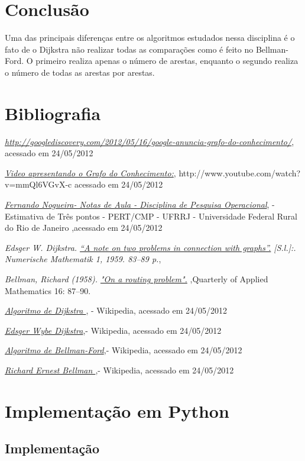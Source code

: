 \documentclass[a4paper,10pt]{article}
\newcommand{\code}[2]{
  \hrulefill
  \subsection*{#1}
  
  \vspace{2em}
}
\begin{document}
\section{Conclusão}{
Uma das principais diferenças entre os algoritmos estudados nessa disciplina é o fato de o Dijkstra não realizar
todas as comparações como é feito no Bellman-Ford. O primeiro realiza apenas o número de arestas, enquanto
o segundo realiza o número de todas as arestas por arestas.

}



\section{Bibliografia}{
 \begin{thebibliography}{9}
  \emph{\href{http://goo.gl/bZyyN}{http://googlediscovery.com/2012/05/16/google-anuncia-grafo-do-conhecimento/}},  acessado em 24/05/2012

  \emph{\href{http://www.youtube.com/watch?v=mmQl6VGvX-c}{Video apresentando o Grafo do Conhecimento:}}, http://www.youtube.com/watch?v=mmQl6VGvX-c acessado em 24/05/2012
 
  \emph{\href{http://www.ufrrj.br/codep/materialcursos/gerenciamento/gerenciamentotempo/CGP-GT_PERT_CPM_FernandoNogueira.pdf}{ Fernando Nogueira- Notas de Aula - Disciplina de Pesquisa Operacional}}, - Estimativa de Três pontos - PERT/CMP - UFRRJ - Universidade Federal Rural do Rio de Janeiro ,acessado em 24/05/2012
 

  \emph{Edsger W. Dijkstra. \href{http://www-m3.ma.tum.de/foswiki/pub/MN0506/WebHome/dijkstra.pdf}{``A note on two problems in connection with graphs''.}
 [S.l.]:. Numerische Mathematik 1, 1959. 83–89 p.},
    
  \emph{Bellman, Richard (1958). \href{http://monet.skku.ac.kr/course_materials/undergraduate/al/lecture/2006/BellmanFord.pdf}{"On a routing problem".} },Quarterly of Applied Mathematics 16: 87–90.   
 

  \emph{\href{http://pt.wikipedia.org/wiki/Algoritmo_de_Dijkstra}{Algoritmo de Dijkstra }}, - Wikipedia, acessado em 24/05/2012

  \emph{\href{http://pt.wikipedia.org/wiki/Edsger_Dijkstra}{Edsger Wybe Dijkstra}},- Wikipedia, acessado em 24/05/2012

  \emph{\href{http://pt.wikipedia.org/wiki/Algoritmo_de_Bellman-Ford}{Algoritmo de Bellman-Ford}},- Wikipedia, acessado em 24/05/2012

  \emph{\href{http://en.wikipedia.org/wiki/Richard_E._Bellman}{Richard Ernest Bellman }},- Wikipedia, acessado em 24/05/2012
\end{thebibliography}
}

\section{Implementação em Python}{
\code{Implementação}{caminho_minimo.py}
}
\end{document}
